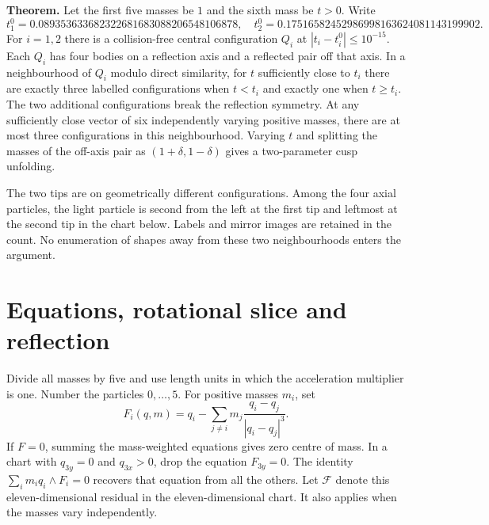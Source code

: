 \documentclass[11pt]{article}
\newcommand{\F}{\mathcal F}
\begin{document}
\textbf{Theorem.}
Let the first five masses be $1$ and the sixth mass be $t>0$.
Write
\[
t_1^0=0.089353633682322681683088206548106878,\quad
t_2^0=0.17516582452986998163624081143199902.
\]
For $i=1,2$ there is a collision-free central configuration $Q_i$ at
$|t_i-t_i^0|\le10^{-15}$. Each $Q_i$ has four bodies on a reflection axis
and a reflected pair off that axis. In a neighbourhood of $Q_i$ modulo
direct similarity, for $t$ sufficiently close to $t_i$ there are exactly three
labelled configurations when $t<t_i$ and exactly one when $t\ge t_i$.
The two additional configurations break the reflection symmetry.
At any sufficiently close vector of six independently varying positive masses,
there are at most three configurations in this neighbourhood. Varying $t$ and
splitting the masses of the off-axis pair as $(1+\delta,1-\delta)$ gives a
two-parameter cusp unfolding.

The two tips are on geometrically different configurations. Among the four
axial particles, the light particle is second from the left at the first tip
and leftmost at the second tip in the chart below. Labels and mirror images
are retained in the count. No enumeration of shapes away from these two
neighbourhoods enters the argument.

\newpage
\section{Equations, rotational slice and reflection}
Divide all masses by five and use length units in which the acceleration
multiplier is one. Number the particles $0,\ldots,5$. For positive masses
$m_i$, set
\[
 F_i(q,m)=q_i-\sum_{j\ne i}m_j
 \frac{q_i-q_j}{|q_i-q_j|^3}.
\]
If $F=0$, summing the mass-weighted equations gives zero centre of mass.
In a chart with $q_{3y}=0$ and $q_{3x}>0$, drop the equation $F_{3y}=0$.
The identity $\sum_i m_i q_i\wedge F_i=0$ recovers that equation from all
the others. Let $\F$ denote this eleven-dimensional residual in the
eleven-dimensional chart. It also applies when the masses vary independently.
\end{document}
